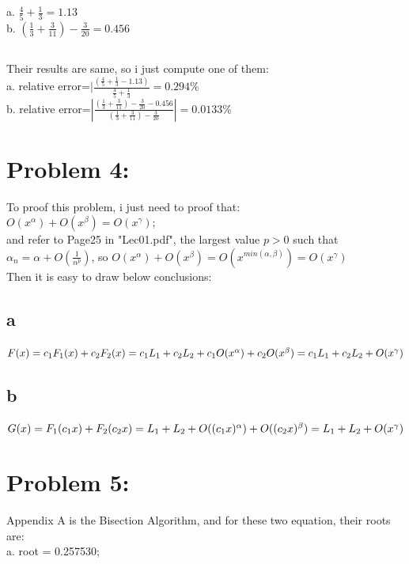 \documentclass{article}
\begin{document}
\subsection{}
a. $\frac{4}{5}+\frac{1}{3}=1.13$ \\
b. $(\frac{1}{3}+\frac{3}{11})-\frac{3}{20}=0.456$
\subsection{}
Their results are same, so i just compute one of them: \\
a. relative error=$|\frac{(\frac{4}{5}+\frac{1}{3}-1.13)}{\frac{4}{5}+\frac{1}{3}}=0.294$\%$ $ \\
b. relative error=$|\frac{(\frac{1}{3}+\frac{3}{11})-\frac{3}{20}-0.456}{(\frac{1}{3}+\frac{3}{11})-\frac{3}{20}}|=0.0133$\%$ $

\section{Problem 4:}   
To proof this problem, i just need to proof that: \\
$O(x^{\alpha})+O(x^{\beta})=O(x^{\gamma})$; \\
and refer to Page25 in "Lec01.pdf", the largest value $p>0$ such that $\alpha_n=\alpha+O(\frac{1}{n^{p}})$, so $O(x^{\alpha})+O(x^{\beta})=O(x^{min(\alpha,\beta)})=O(x^{\gamma})$ \\
Then it is easy to draw below conclusions:
\subsection{a}
$F(x)=c_1 F_1(x)+c_2 F_2(x) \\
=c_1 L_1+c_2 L_2+c_1 O(x^{\alpha})+c_2 O(x^{\beta}) \\
=c_1 L_1+c_2 L_2+O(x^{\gamma})$
\subsection{b}
$G(x)=F_1(c_1 x)+F_2(c_2 x) \\
=L_1+L_2+O((c_1 x)^{\alpha})+O((c_2 x)^{\beta}) \\
=L_1+L_2+O(x^{\gamma})$

\section{Problem 5:}
Appendix A is the Bisection Algorithm, and for these two equation, their roots are: \\
a. root = 0.257530; \\
\end{document}
